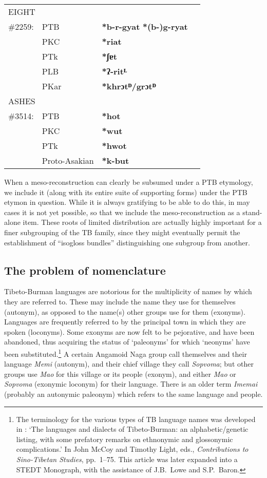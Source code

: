 \begin{tabular}{l l l p{3.25in}}
\multicolumn{4}{l}{EIGHT} \\
\#2259: & PTB & \textbf{*b-r-gyat} \STEDTU{⪤} \textbf{*(b-)g-ryat} \\
 & PKC & \textbf{*riat} \\
 & PTk & \textbf{*ʃɐt} \\
 & PLB & \textbf{*ʔ-ritᴸ} \\
 & PKar & \textbf{*khrɔtᴰ/grɔtᴰ} \\

\multicolumn{4}{l}{ASHES} \\
\#3514: & PTB & \textbf{*hot} \\
 & PKC & \textbf{*wut} \\
 & PTk & \textbf{*hwot} \\
 & Proto-Asakian & \textbf{*k-but} \\
\end{tabular}

When a meso-reconstruction can clearly be subsumed under a PTB etymology, we include it (along with its entire suite of supporting forms) under the PTB etymon in question. 
While it is always gratifying to be able to do this, in may cases it is not yet possible, so that we include the meso-reconstruction as a stand-alone item. These roots of limited distribution are actually highly important for a finer subgrouping of the TB family, since they might eventually permit the establishment of “isogloss bundles” distinguishing one subgroup from another.

\subsection{The problem of nomenclature}

Tibeto-Burman languages are notorious for the multiplicity of names by which
they are referred to. These may include the name they use for themselves
(autonym), as opposed to the name(s) other groups use for them (exonyms). 
Languages are frequently referred to by the principal town in which they are
spoken (loconyms). Some exonyms are now felt to be pejorative, and have been
abandoned, thus acquiring the status of ‘paleonyms’ for which ‘neonyms’ have
been substituted.\footnote{The terminology for the various types of TB language
names was developed in \citealt{JAM-LDTB}: ‘The languages and dialects of
Tibeto-Burman: an alphabetic/genetic listing, with some prefatory remarks on
ethnonymic and glossonymic complications.’  In John McCoy and Timothy Light,
eds., \textit{Contributions to Sino-Tibetan Studies},  pp.~1–75. This article was later
\citeyear{JAM-LDTB2} expanded into a STEDT Monograph, with the assistance of J.B.\ Lowe and
S.P.\ Baron.} A certain Angamoid Naga group call themselves and their language
\textit{Memi} (autonym), and their chief village they call \textit{Sopvoma};
but other groups use \textit{Mao} for this village or its people (exonym), and either \textit{Mao}
or \textit{Sopvoma} (exonymic loconym) for their language. There is an older term \textit{Imemai} (probably an
autonymic paleonym) which refers to the same language and people.


